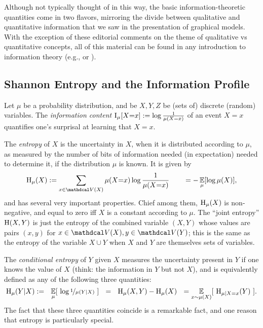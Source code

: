 Although not typically thought of in this way, 
    the basic information-theoretic quantities come in two flavors, mirroring the divide between qualitative and quantitative information that we saw in the presentation of graphical models. 
With the exception of these editorial comments on the theme of qualitative vs quantitative concepts, all of this material can be found in any introduction to information
theory (e.g., \citet[Chapter 1]{mackay2003information} or \citet{CoverThomas}).  

\subsection{Shannon Entropy and the Information Profile}
    \label{sec:qual-info-theory-primer}

Let $\mu$ be a probability distribution, and be $X,Y,Z$
    be (sets of) discrete (random) variables.
The \emph{information content} $\operatorname{\mathrm{I}}_{\mu}[ X{=}x ] := \log \frac1{\mu(X{=}x)}$ of an event $X{=}x$ quantifies one's surprisal at learning that $X{=}x$.
    
The \emph{entropy} of $X$ is the uncertainty in $X$, when it is distributed according to $\mu$, as measured by the number of bits of information needed (in expectation) needed to determine it, if the distribution $\mu$ is known.  It is given by 
\[
    \H_\mu(X) := \sum_{x \in \V(X)} \mu(X{=}x) \log \frac{1}{\mu(X{=}x)} \qquad= -\Ex_{\mu}[\log \mu(X)],
\]
and has several very important properties. 
Chief among them, $\operatorname{\mathrm{H}}_\mu(X)$ is non-negative, and equal to zero iff $X$ 
    is a constant according to $\mu$. 
The ``joint entropy'' $\operatorname{\mathrm{H}}(X,Y)$ is just the entropy of the combined variable $(X,Y)$ whose values are pairs $(x,y)$ for $x \in \V(X),y \in \V(Y)$; this is the same as the entropy of the variable $X \cup Y$ when $X$ and $Y$ are themselves sets of variables. 

The \emph{conditional entropy} of $Y$ given $X$
measures the uncertainty present in $Y$ if one knows the value of $X$
(think: the information in $Y$ but not $X$),
and is equivalently defined as any of the following three quantities:
\[
\operatorname{\mathrm{H}}_\mu( Y | X) :=
    ~~
    \operatorname*{\mathbb{E}}_{\mu} [~\log \nicefrac1{\mu(Y | X)}~]
    ~~=~~\operatorname{\mathrm{H}}_\mu(X,Y) - \operatorname{\mathrm{H}}_\mu(X)
    ~~=\operatorname*{\mathbb{E}}_{x \sim \mu(X)} [~\operatorname{\mathrm{H}}_{\mu \mid X{=}x}(Y)~]    
.
\]
The fact that these three quantities coincide is a remarkable fact,
and one reason that entropy is particularly special. 

